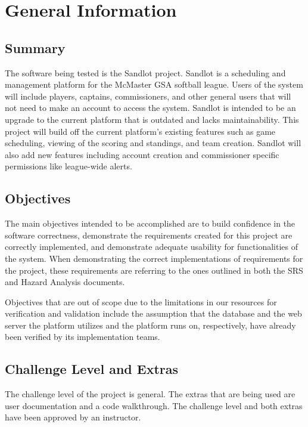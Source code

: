 \documentclass[12pt, titlepage]{article}
\begin{document}
\section{General Information}

\subsection{Summary}

The software being tested is the Sandlot project. Sandlot is a scheduling and
management platform for the McMaster GSA softball league. Users of the system
will include players, captains, commissioners, and other general users that will
not need to make an account to access the system. Sandlot is intended to be an
upgrade to the current platform that is outdated and lacks maintainability. This
project will build off the current platform's existing features such as game
scheduling, viewing of the scoring and standings, and team creation. Sandlot will
also add new features including account creation and commissioner specific
permissions like league-wide alerts.

\subsection{Objectives}

The main objectives intended to be accomplished are to build confidence in the software
correctness, demonstrate the requirements created for this project are correctly
implemented, and demonstrate adequate usability for functionalities of the
system. When demonstrating the correct implementations of requirements for the
project, these requirements are referring to the ones outlined in both the
SRS and Hazard Analysis documents.

Objectives that are out of scope due to the limitations in our resources for
verification and validation include the assumption that the database and the web
server the platform utilizes and the platform runs on, respectively, have already
been verified by its implementation teams.

\subsection{Challenge Level and Extras}

The challenge level of the project is general. The extras that are being used
are user documentation and a code walkthrough. The challenge level and both extras
have been approved by an instructor.
\end{document}

